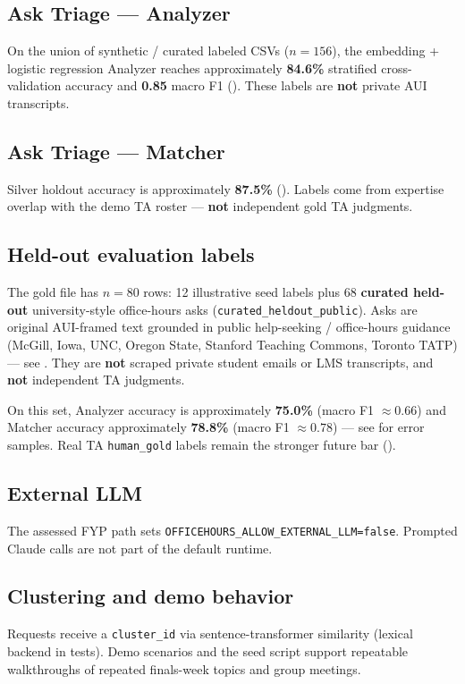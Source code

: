 \documentclass[11pt]{article}
\begin{document}
\subsection{Ask Triage --- Analyzer}
On the union of synthetic / curated labeled CSVs ($n=156$), the embedding +
logistic regression Analyzer reaches approximately \textbf{84.6\%} stratified
cross-validation accuracy and \textbf{0.85} macro F1
(). These labels are
\textbf{not} private AUI transcripts.

\subsection{Ask Triage --- Matcher}
Silver holdout accuracy is approximately \textbf{87.5\%}
(). Labels come from expertise
overlap with the demo TA roster --- \textbf{not} independent gold TA judgments.

\subsection{Held-out evaluation labels}
The gold file has $n=80$ rows: 12 illustrative seed labels plus 68
\textbf{curated held-out} university-style office-hours asks
(\texttt{curated\_heldout\_public}). Asks are original AUI-framed text grounded in
public help-seeking / office-hours guidance (McGill, Iowa, UNC, Oregon State,
Stanford Teaching Commons, Toronto TATP) --- see
. They are \textbf{not}
scraped private student emails or LMS transcripts, and \textbf{not} independent
TA judgments.

On this set, Analyzer accuracy is approximately \textbf{75.0\%}
(macro F1 $\approx 0.66$) and Matcher accuracy approximately \textbf{78.8\%}
(macro F1 $\approx 0.78$) --- see
 for error samples.
Real TA \texttt{human\_gold} labels remain the stronger future bar
().

\subsection{External LLM}
The assessed FYP path sets \texttt{OFFICEHOURS\_ALLOW\_EXTERNAL\_LLM=false}.
Prompted Claude calls are not part of the default runtime.

\subsection{Clustering and demo behavior}
Requests receive a \texttt{cluster\_id} via sentence-transformer similarity
(lexical backend in tests). Demo scenarios and the seed script support
repeatable walkthroughs of repeated finals-week topics and group meetings.
\end{document}
